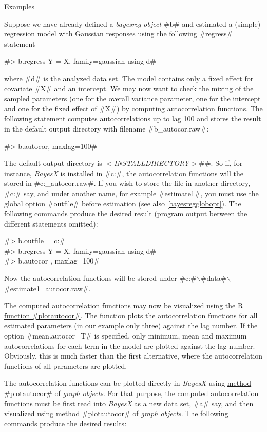 \begin{stanza}{Examples}

Suppose we have already defined a {\em bayesreg object} #b# and
estimated a (simple) regression model with Gaussian responses
using the following #regress# statement

#> b.regress Y = X, family=gaussian using d#

where #d# is the analyzed data set. The model contains only a
fixed effect for covariate #X# and an intercept. We may now want
to check the mixing of the sampled parameters (one for the overall
variance parameter, one for the intercept and one for the fixed
effect of #X#) by computing autocorrelation functions. The
following statement computes autocorrelations up to lag 100 and
stores the result in the default output directory with filename
#b_autocor.raw#:

#> b.autocor, maxlag=100#

The default output directory is
{\em$<$INSTALLDIRECTORY$>$}#\output#. So if, for instance, {\em
BayesX} is installed in #c:\bayes#, the autocorrelation functions
will the stored in #c:\bayes\output\b_autocor.raw#. If you wish to
store the file in another directory, #c:\data# say, and under
another name, for example #estimate1#, you must use the global
option #outfile# before estimation (see also
\autoref{bayesregglobopt}). The following commands produce the
desired result (program output between the different statements
omitted):

#> b.outfile = c:\data{}# \\
#> b.regress Y = X, family=gaussian using d# \\
#> b.autocor , maxlag=100#

Now the autocorrelation functions will be stored under
#c:#$\backslash$#data#$\backslash$#estimate1_autocor.raw#.

The computed autocorrelation functions may now be visualized using
the \hyperref[rpackage]{R function #plotautocor#}.
The function plots the autocorrelation functions for all estimated
parameters (in our example only three) against the lag number. If
the option #mean.autocor=T# is specified, only minimum, mean and
maximum autocorrelations for each term in the model are plotted
against the lag number. Obviously, this is much faster than the
first alternative, where the autocorrelation functions of all
parameters are plotted.

The autocorrelation functions can be plotted directly in {\em
BayesX} using \hyperref[graphplotautocor]{method #plotautocor#} of
{\em graph objects}. For that purpose, the computed autocorrelation
functions must be first read into {\em BayesX} as a new data set,
#a# say, and then visualized using method #plotautocor# of {\em
graph objects}. The following commands produce the desired results:


\end{stanza}
